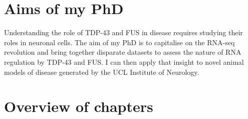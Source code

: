 %
%
%
%
%
%
%



\section{Aims of my PhD} 



Understanding the role of TDP-43 and FUS in disease requires studying their roles in neuronal cells.
The aim of my PhD is to capitalise on the RNA-seq revolution and bring together disparate datasets to assess the nature of RNA regulation by TDP-43 and FUS.
I can then apply that insight to novel animal models of disease generated by the UCL Institute of Neurology.


\section{Overview of chapters}

